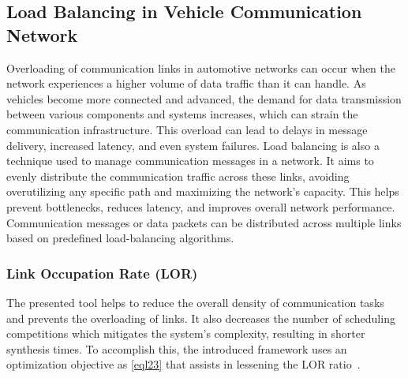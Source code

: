   
    
    
    
    \subsection{Load Balancing in Vehicle Communication Network} 
    
    Overloading of communication links in automotive networks can occur when the network experiences a higher volume of data traffic than it can handle. As vehicles become more connected and advanced, the demand for data transmission between various components and systems increases, which can strain the communication infrastructure. This overload can lead to delays in message delivery, increased latency, and even system failures.
    Load balancing is also a technique used to manage communication messages in a network.
    It aims to evenly distribute the communication traffic across these links, avoiding overutilizing any specific path and maximizing the network's capacity. This helps prevent bottlenecks, reduces latency, and improves overall network performance.
    Communication messages or data packets can be distributed across multiple links based on predefined load-balancing algorithms. %
    
    \subsubsection{Link Occupation Rate (LOR)}
    
    The presented tool helps to reduce the overall density of communication tasks and prevents the overloading of links. It also decreases the number of scheduling competitions which mitigates the system's complexity, resulting in shorter synthesis times. To accomplish this, the introduced framework uses an optimization objective as \eqref{eql23} that assists in lessening the LOR ratio~\cite{askaripoor2023designer}.\newline
    
